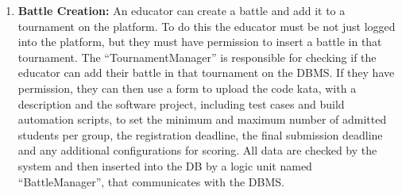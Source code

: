 \begin{enumerate}
   \item \textbf{Battle Creation:}
An educator can create a battle and add it to a tournament on the platform. To do this the educator must be not just logged into the platform, but they must have permission to insert a battle in that tournament. The “TournamentManager” is responsible for checking if the educator can add their battle in that tournament on the DBMS. If they have permission, they can then use a form to upload the code kata, with a description and the software project, including test cases and build automation scripts, to set the minimum and maximum number of admitted students per group, the registration deadline, the final submission deadline and any additional configurations for scoring. All data are checked by the system and then inserted into the DB by a logic unit named “BattleManager”, that communicates with the DBMS.
    

\end{enumerate}
